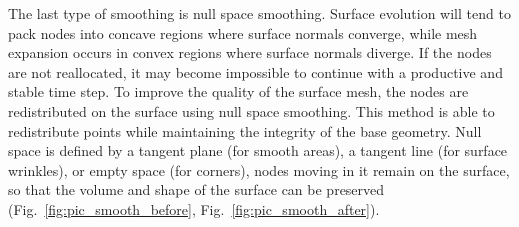 The last type of smoothing is null space smoothing.
Surface evolution will tend to pack nodes into concave regions where surface normals converge, while mesh expansion occurs in convex regions where surface normals diverge.
If the nodes are not reallocated, it may become impossible to continue with a productive and stable time step.
To improve the quality of the surface mesh, the nodes are redistributed on the surface using null space smoothing.
This method is able to redistribute points while maintaining the integrity of the base geometry.
Null space is defined by a tangent plane (for smooth areas), a tangent line (for surface wrinkles), or empty space (for corners), nodes moving in it remain on the surface, so that the volume and shape of the surface can be preserved (Fig.~\ref{fig:pic_smooth_before}, Fig.~\ref{fig:pic_smooth_after}).